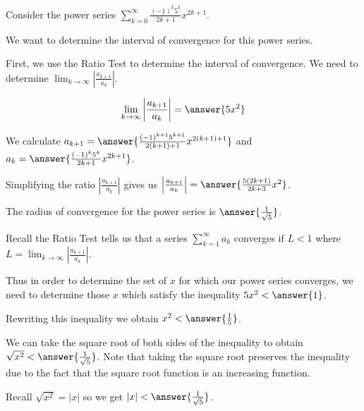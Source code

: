 \documentclass{ximera}
\author{Jim Talamo}
\begin{document}
\begin{exercise}
Consider the power series $\sum_{k=0}^{\infty} \frac{(-1)^k 5^k }{2k+1}x^{2k+1}$.

We want to determine the interval of convergence for this power series. 











\begin{exercise}

First, we use the Ratio Test to determine the interval of convergence. 
We need to determine $\lim_{k \to \infty}\left| \frac{a_{k+1}}{a_k} \right|$. 

\[
\lim_{k \to \infty}\left|\frac{ a_{k+1}}{a_k}\right| =\answer{5x^2}
\]


\begin{hint}
We calculate $a_{k+1}=\answer{\frac{(-1)^{k+1} 5^{k+1}}{2(k+1)+1} x^{2(k+1)+1}}$ and $a_k=\answer{ \frac{(-1)^k 5^k}{2k+1}x^{2k+1}}$. 

Simplifying the ratio $\left|\frac{a_{k+1}}{a_k}\right|$ gives us $\left|\frac{a_{k+1}}{a_k}\right|=\answer{ \frac{5 (2k+1)}{2k+3}x^2}$. 
\end{hint}





\begin{exercise}

The radius of convergence for the power series is $\answer{\frac{1}{\sqrt{5}}}$.


\begin{hint}

Recall the Ratio Test tells us that a series $\sum^{\infty}_{k=1} a_k$ converges if $L <1$ where $L=\lim_{k \to \infty}\left| \frac{a_{k+1}}{a_k}\right|$. 

Thus in order to determine the set of $x$ for which our power series converges, we need to determine those $x$ which satisfy 
the inequality $5x^2 <\answer{1}$. 

Rewriting this inequality we obtain $x^2< \answer{\frac{1}{5}}$. 

We can take the square root of both sides of the inequality to obtain $\sqrt{ x^2}<\answer{\frac{1}{\sqrt{5}}}$. Note that taking the square root preserves the inequality due to the fact that the square root function is an increasing function.

Recall $\sqrt{x^2}=|x|$ so we get $|x|< \answer{ \frac{1}{\sqrt{5}} }$. 



\end{hint}
\end{exercise}
\end{exercise}
\end{exercise}
\end{document}
